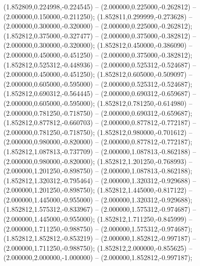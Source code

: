  (1.852809,0.224998,-0.224545) -- (2.000000,0.225000,-0.262812) -- (2.000000,0.150000,-0.211250);
 (1.852811,0.299999,-0.273628) -- (2.000000,0.300000,-0.320000) -- (2.000000,0.225000,-0.262812);
 (1.852812,0.375000,-0.327477) -- (2.000000,0.375000,-0.382812) -- (2.000000,0.300000,-0.320000);
 (1.852812,0.450000,-0.386090) -- (2.000000,0.450000,-0.451250) -- (2.000000,0.375000,-0.382812);
 (1.852812,0.525312,-0.448936) -- (2.000000,0.525312,-0.524687) -- (2.000000,0.450000,-0.451250);
 (1.852812,0.605000,-0.509097) -- (2.000000,0.605000,-0.595000) -- (2.000000,0.525312,-0.524687);
 (1.852812,0.690312,-0.564445) -- (2.000000,0.690312,-0.659687) -- (2.000000,0.605000,-0.595000);
 (1.852812,0.781250,-0.614980) -- (2.000000,0.781250,-0.718750) -- (2.000000,0.690312,-0.659687);
 (1.852812,0.877812,-0.660703) -- (2.000000,0.877812,-0.772187) -- (2.000000,0.781250,-0.718750);
 (1.852812,0.980000,-0.701612) -- (2.000000,0.980000,-0.820000) -- (2.000000,0.877812,-0.772187);
 (1.852812,1.087813,-0.737709) -- (2.000000,1.087813,-0.862188) -- (2.000000,0.980000,-0.820000);
 (1.852812,1.201250,-0.768993) -- (2.000000,1.201250,-0.898750) -- (2.000000,1.087813,-0.862188);
 (1.852812,1.320312,-0.795464) -- (2.000000,1.320312,-0.929688) -- (2.000000,1.201250,-0.898750);
 (1.852812,1.445000,-0.817122) -- (2.000000,1.445000,-0.955000) -- (2.000000,1.320312,-0.929688);
 (1.852812,1.575312,-0.833967) -- (2.000000,1.575312,-0.974687) -- (2.000000,1.445000,-0.955000);
 (1.852812,1.711250,-0.845999) -- (2.000000,1.711250,-0.988750) -- (2.000000,1.575312,-0.974687);
 (1.852812,1.852812,-0.853219) -- (2.000000,1.852812,-0.997187) -- (2.000000,1.711250,-0.988750);
 (1.852812,2.000000,-0.855625) -- (2.000000,2.000000,-1.000000) -- (2.000000,1.852812,-0.997187);
